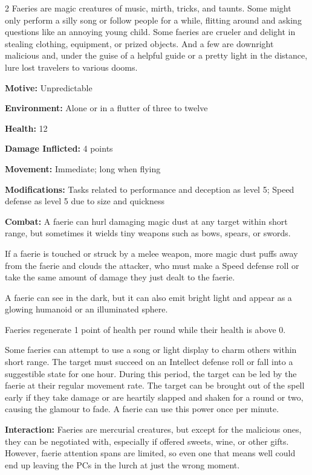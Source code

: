 \begin{multicols}{2}
Faeries are magic creatures of music, mirth, tricks, and taunts. Some might only perform a silly song or follow people for a while, flitting around and asking questions like an annoying young child. Some faeries are crueler and delight in stealing clothing, equipment, or prized objects. And a few are downright malicious and, under the guise of a helpful guide or a pretty light in the distance, lure lost travelers to various dooms. 

\textbf{Motive:} Unpredictable 

\textbf{Environment:} Alone or in a flutter of three to twelve 

\textbf{Health:} 12 

\textbf{Damage Inflicted:} 4 points 

\textbf{Movement:} Immediate; long when flying 

\textbf{Modifications:} Tasks related to performance and deception as level 5; Speed defense as level 5 due to size and quickness 

\textbf{Combat:} A faerie can hurl damaging magic dust at any target within short range, but sometimes it wields tiny weapons such as bows, spears, or swords. 

If a faerie is touched or struck by a melee weapon, more magic dust puffs away from the faerie and clouds the attacker, who must make a Speed defense roll or take the same amount of damage they just dealt to the faerie. 

A faerie can see in the dark, but it can also emit bright light and appear as a glowing humanoid or an illuminated sphere. 

Faeries regenerate 1 point of health per round while their health is above 0. 

Some faeries can attempt to use a song or light display to charm others within short range. The target must succeed on an Intellect defense roll or fall into a suggestible state for one hour. During this period, the target can be led by the faerie at their regular movement rate. The target can be brought out of the spell early if they take damage or are heartily slapped and shaken for a round or two, causing the glamour to fade. A faerie can use this power once per minute. 

\textbf{Interaction:} Faeries are mercurial creatures, but except for the malicious ones, they can be negotiated with, especially if offered sweets, wine, or other gifts. However, faerie attention spans are limited, so even one that means well could end up leaving the PCs in the lurch at just the wrong moment. 


\end{multicols}
